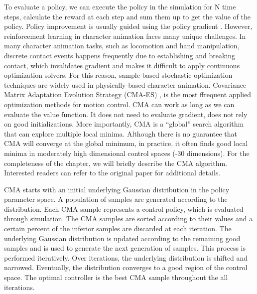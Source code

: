 To evaluate a policy, we can execute the policy in the simulation for N time steps, calculate the reward at each step and sum them up to get the value of the policy. Policy improvement is usually guided using the policy gradient \cite{Ng:2000:PPS}. However, reinforcement learning in character animation faces many unique challenges. In many character animation tasks, such as locomotion and hand manipulation, discrete contact events happens frequently due to establishing and breaking contact, which invalidates gradient and makes it difficult to apply continuous optimization solvers. For this reason, sample-based stochastic optimization techniques are widely used in physically-based character animation. Covariance Matrix Adaptation Evolution Strategy (CMA-ES) \cite{}, is the most ffrequent applied optimization methods for motion control. CMA can work as long as we can evaluate the value function. It does not need to evaluate gradient, does not rely on good initializations. More importantly, CMA is a ``global'' search algorithm that can explore multiple local minima. Although there is no guarantee that CMA will converge at the global minimum, in practice, it often finds good local minima in moderately high dimensional control spaces (-30 dimensions). For the completeness of the chapter, we will briefly describe the CMA algorithm. Interested readers can refer to the original paper \cite{} for additional details.

CMA starts with an initial underlying Gaussian distribution in the policy parameter space. A population of samples are generated according to the distribution. Each CMA sample represents a control policy, which is evaluated through simulation. The CMA samples are sorted according to their values and a certain percent of the inferior samples are discarded at each iteration. The underlying Gaussian distribution is updated according to the remaining good samples and is used to generate the next generation of samples. This process is performed iteratively. Over iterations, the underlying distribution is shifted and narrowed. Eventually,  the distribution converges to a good region of the control space. The optimal controller is the  best CMA sample throughout the all iterations.

